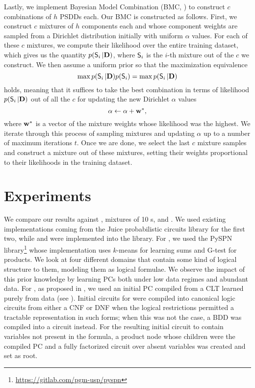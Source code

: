 Lastly, we implement Bayesian Model Combination (BMC, \cite{monteith11}) to construct $c$
combinations of $h$ PSDDs each. Our BMC is constructed as follows. First, we construct $c$ mixtures
of $h$ components each and whose component weights are sampled from a Dirichlet distribution
initially with uniform $\alpha$ values. For each of these $c$ mixtures, we compute their likelihood
over the entire training dataset, which gives us the quantity $p(\operatorname{\textup{\textsf{S}}}_i|\mathbf{D})$, where $\operatorname{\textup{\textsf{S}}}_i$
is the $i$-th mixture out of the $c$ we construct. We then assume a uniform prior so that the
maximization equivalence
\begin{equation}
  \max p(\operatorname{\textup{\textsf{S}}}_i|\mathbf{D})p(\operatorname{\textup{\textsf{S}}}_i)=\max p(\operatorname{\textup{\textsf{S}}}_i|\mathbf{D})
\end{equation}
holds, meaning that it suffices to take the best combination in terms of likelihood
$p(\operatorname{\textup{\textsf{S}}}_i|\mathbf{D})$ out of all the $c$ for updating the new Dirichlet $\alpha$ values
\begin{equation}
  \alpha\gets\alpha + \mathbf{w}^\ast,
\end{equation}
where $\mathbf{w}^\ast$ is a vector of the mixture weights whose likelihood was the highest. We
iterate through this process of sampling mixtures and updating $\alpha$ up to a number of maximum
iterations $t$. Once we are done, we select the last $c$ mixture samples and construct a mixture
out of these mixtures, setting their weights proportional to their likelihoods in the training
dataset.

\section{Experiments}
\label{sec:logical-exp}

We compare our results against , mixtures of 10 s,
 and . We used existing implementations coming from the
Juice probabilistic circuits library \citep{dang21} for the first two, while 
and  were implemented into the library. For , we used the
PySPN library\footnote{\url{https://gitlab.com/pgm-usp/pyspn}} whose implementation uses $k$-means
for learning sums and G-test for products. We look at four different domains that contain some
kind of logical structure to them, modeling them as logical formulae. We observe the impact of this prior
knowledge by learning PCs both under low data regimes and abundant data. For , as
proposed in \citet{dang20}, we used an initial PC compiled from a CLT learned purely from data (see
). Initial circuits for  were compiled into canonical logic
circuits from either a CNF or DNF when the logical restrictions permitted a tractable
representation in such forms; when this was not the case, a BDD was compiled into a circuit
instead. For the resulting initial circuit to contain variables not present in the formula, a
product node whose children were the compiled PC and a fully factorized circuit over absent
variables was created and set as root.

